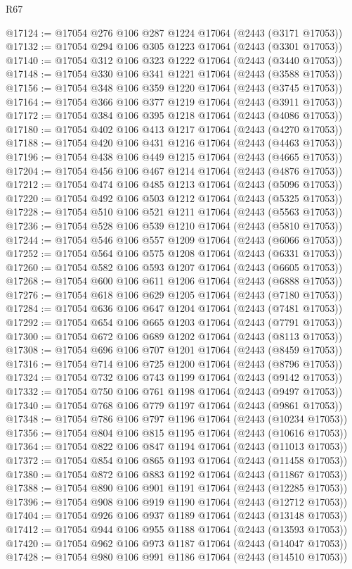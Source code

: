 \begin{lexlean}{R67}
\begin{coremodule}
@17124 := @17054 @276 @106 @287 @1224 @17064 (@2443 (@3171 @17053))
@17132 := @17054 @294 @106 @305 @1223 @17064 (@2443 (@3301 @17053))
@17140 := @17054 @312 @106 @323 @1222 @17064 (@2443 (@3440 @17053))
@17148 := @17054 @330 @106 @341 @1221 @17064 (@2443 (@3588 @17053))
@17156 := @17054 @348 @106 @359 @1220 @17064 (@2443 (@3745 @17053))
@17164 := @17054 @366 @106 @377 @1219 @17064 (@2443 (@3911 @17053))
@17172 := @17054 @384 @106 @395 @1218 @17064 (@2443 (@4086 @17053))
@17180 := @17054 @402 @106 @413 @1217 @17064 (@2443 (@4270 @17053))
@17188 := @17054 @420 @106 @431 @1216 @17064 (@2443 (@4463 @17053))
@17196 := @17054 @438 @106 @449 @1215 @17064 (@2443 (@4665 @17053))
@17204 := @17054 @456 @106 @467 @1214 @17064 (@2443 (@4876 @17053))
@17212 := @17054 @474 @106 @485 @1213 @17064 (@2443 (@5096 @17053))
@17220 := @17054 @492 @106 @503 @1212 @17064 (@2443 (@5325 @17053))
@17228 := @17054 @510 @106 @521 @1211 @17064 (@2443 (@5563 @17053))
@17236 := @17054 @528 @106 @539 @1210 @17064 (@2443 (@5810 @17053))
@17244 := @17054 @546 @106 @557 @1209 @17064 (@2443 (@6066 @17053))
@17252 := @17054 @564 @106 @575 @1208 @17064 (@2443 (@6331 @17053))
@17260 := @17054 @582 @106 @593 @1207 @17064 (@2443 (@6605 @17053))
@17268 := @17054 @600 @106 @611 @1206 @17064 (@2443 (@6888 @17053))
@17276 := @17054 @618 @106 @629 @1205 @17064 (@2443 (@7180 @17053))
@17284 := @17054 @636 @106 @647 @1204 @17064 (@2443 (@7481 @17053))
@17292 := @17054 @654 @106 @665 @1203 @17064 (@2443 (@7791 @17053))
@17300 := @17054 @672 @106 @689 @1202 @17064 (@2443 (@8113 @17053))
@17308 := @17054 @696 @106 @707 @1201 @17064 (@2443 (@8459 @17053))
@17316 := @17054 @714 @106 @725 @1200 @17064 (@2443 (@8796 @17053))
@17324 := @17054 @732 @106 @743 @1199 @17064 (@2443 (@9142 @17053))
@17332 := @17054 @750 @106 @761 @1198 @17064 (@2443 (@9497 @17053))
@17340 := @17054 @768 @106 @779 @1197 @17064 (@2443 (@9861 @17053))
@17348 := @17054 @786 @106 @797 @1196 @17064 (@2443 (@10234 @17053))
@17356 := @17054 @804 @106 @815 @1195 @17064 (@2443 (@10616 @17053))
@17364 := @17054 @822 @106 @847 @1194 @17064 (@2443 (@11013 @17053))
@17372 := @17054 @854 @106 @865 @1193 @17064 (@2443 (@11458 @17053))
@17380 := @17054 @872 @106 @883 @1192 @17064 (@2443 (@11867 @17053))
@17388 := @17054 @890 @106 @901 @1191 @17064 (@2443 (@12285 @17053))
@17396 := @17054 @908 @106 @919 @1190 @17064 (@2443 (@12712 @17053))
@17404 := @17054 @926 @106 @937 @1189 @17064 (@2443 (@13148 @17053))
@17412 := @17054 @944 @106 @955 @1188 @17064 (@2443 (@13593 @17053))
@17420 := @17054 @962 @106 @973 @1187 @17064 (@2443 (@14047 @17053))
@17428 := @17054 @980 @106 @991 @1186 @17064 (@2443 (@14510 @17053))

\end{coremodule}
\end{lexlean}
